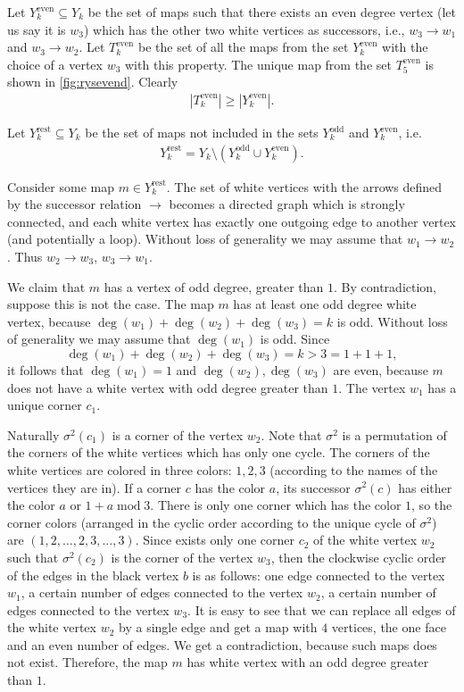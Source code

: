 \documentclass[submission]{FPSAC2021}
\DeclareMathOperator{\degg}{deg}
\DeclareMathOperator{\odd}{odd}
\DeclareMathOperator{\even}{even}
\DeclareMathOperator{\rest}{rest}
\newcommand{\nast}{\sigma}
\begin{document}
Let $Y_{k}^{\even}\subseteq Y_k$ be the set of maps such that there
exists an even degree vertex (let us say it is $w_3$) which has the other 
two white vertices as successors, i.e., $w_3\rightarrow w_1$ and $w_3\rightarrow w_2$. 
Let $T_k^{\even}$ be the set of all the maps from the set $Y_k^{\even}$ with the choice 
of a vertex $w_3$ with this property.  
The unique map from the set $T_{5}^{\even}$ is shown in \cref{fig:rysevend}.
Clearly
\begin{align}
\label{ineqeven}
|T_{k}^{\even}| \geq |Y_{k}^{\even}|.
\end{align}

Let $Y_{k}^{\rest}\subseteq Y_k$ be the set of maps not included in the
sets $Y_{k}^{\odd}$ and $Y_{k}^{\even}$, i.e. 
\begin{align}
\label{yrestdef}
Y_{k}^{\rest}=Y_k \setminus (Y_{k}^{\odd} \cup Y_{k}^{\even}).
\end{align}

Consider some map $m\in Y_{k}^{\rest}$. 
The set of white vertices with the arrows defined by the successor relation
$\rightarrow$ becomes a directed graph which is strongly connected, and each
white vertex has exactly one outgoing edge to another vertex (and potentially a
loop). Without  loss  of  generality  we  may  assume  that $w_1 \rightarrow w_2$. Thus $w_2 \rightarrow w_3$, $w_3 \rightarrow w_1$.

We claim that $m$ has a vertex of odd degree, greater than $1$. By contradiction,  suppose this is not the case. The map $m$ has at least one odd degree white vertex,
because $\degg(w_1)+\degg(w_2)+\degg(w_3)=k$ is odd. Without loss of generality we may assume that $\degg(w_1)$ is odd. Since $$\degg(w_1)+\degg(w_2)+\degg(w_3)=k>3=1+1+1,$$ %
it follows that $\degg(w_1)=1$ and $\degg(w_2),\degg(w_3)$ are even, because $m$
does not have a white vertex with odd degree greater than $1$. The vertex $w_1$
has a unique corner $c_1$.

Naturally $\nast^2(c_1)$ 
is a corner of the vertex $w_2$. 
Note that $\nast^2$ is a permutation of the corners of 
the white vertices which has only one cycle. 
The corners of the white vertices are colored in three colors: $1, 2, 3$
(according to the names of the vertices they are in).  
If a corner $c$ has the color $a$, 
its successor $\nast^2(c)$ has either the color $a$ or $1+a \operatorname{mod} 3$. 
There is only one corner which has the color $1$, so the corner colors 
(arranged in the cyclic order according to the unique cycle of $\nast^2$) are 
$(1, 2, \ldots, 2, 3, \ldots, 3)$.
Since exists only one corner $ c_2 $ of the white vertex $ w_2 $ such 
that $ \nast ^ 2 (c_2) $ is the corner of the vertex $ w_3 $, 
then the clockwise cyclic order of the edges in the black vertex $b$ is as
follows: one edge connected to the vertex $w_1$, a certain number of edges connected
to the vertex $w_2$, a certain number of edges connected to the vertex $w_3$.
It is easy to see that we can replace all edges of the white vertex $w_2$ by a
single edge and get a map with $4$ vertices, the one face and an even number of
edges. We get a contradiction, because such maps does not exist. Therefore, the
map $m$ has white vertex with an odd degree greater than $1$.
\end{document}
